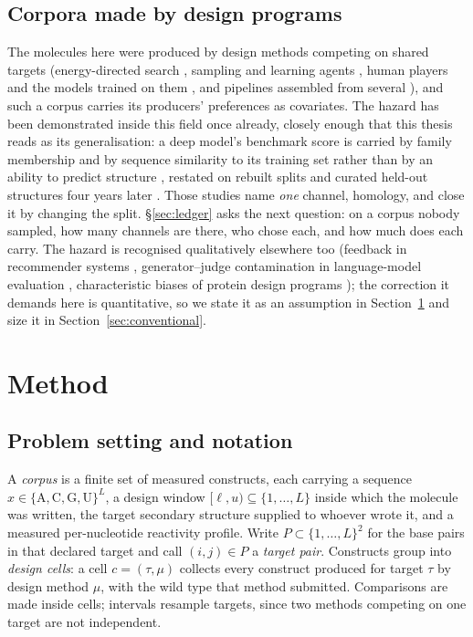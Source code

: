 \documentclass[11pt]{article}
\begin{document}
\subsection{Corpora made by design programs}
The molecules here were produced by design methods competing on shared targets (energy-directed
search \citep{andronescu2004new,busch2006info,zadeh2011nupack}, sampling and learning agents
\citep{kleinkauf2015antarna,runge2019learna}, human players and the models trained on them
\citep{lee2014eterna,andersonlee2016eterna100,koodli2021eternabrain}, and pipelines assembled from
several \citep{yesselman2019computational}), and such a corpus carries its producers' preferences
as covariates. The hazard has been demonstrated inside this field once already, closely enough that
this thesis reads as its generalisation: a deep model's benchmark score is carried by family
membership and by sequence similarity to its training set rather than by an ability to predict
structure \citep{szikszai2022generalize,flamm2022caveats,qiu2023sequence}, restated on rebuilt
splits and curated held-out structures four years later \citep{chanrg2026,szikszai2026gauging}.
Those studies name \emph{one} channel, homology, and close it by changing the split.
\S\ref{sec:ledger} asks the next question: on a corpus nobody sampled, how many channels are there,
who chose each, and how much does each carry. The hazard is recognised qualitatively elsewhere too
(feedback in recommender systems \citep{chaney2018algorithmic}, generator--judge contamination in
language-model evaluation \citep{li2025preference}, characteristic biases of protein design
programs \citep{protdbench2026}); the correction it demands here is quantitative, so we state it as
an assumption in Section~\ref{sec:method} and size it in Section~\ref{sec:conventional}.


\section{Method}
\label{sec:method}

\subsection{Problem setting and notation}
\label{sec:notation}

A \emph{corpus} is a finite set of measured constructs, each carrying a sequence
$x\in\{\mathrm{A,C,G,U}\}^{L}$, a design window $[\ell,u)\subseteq\{1,\dots,L\}$ inside which the
molecule was written, the target secondary structure supplied to whoever wrote it, and a measured
per-nucleotide reactivity profile. Write $P\subset\{1,\dots,L\}^{2}$ for the base pairs in that
declared target and call $(i,j)\in P$ a \emph{target pair}. Constructs group into \emph{design cells}: a cell $c=(\tau,\mu)$ collects every construct produced
for target $\tau$ by design method $\mu$, with the wild type that method submitted. Comparisons are
made inside cells; intervals resample targets, since two methods competing on one target are not
independent.
\end{document}
